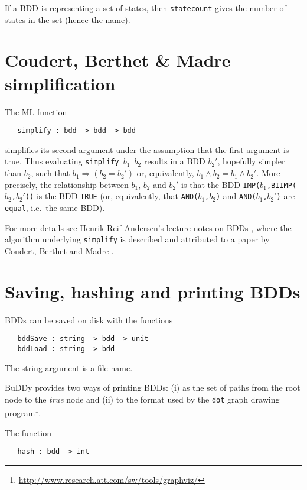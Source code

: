 \documentclass[12pt]{article}
\newcommand{\bnind}[1]{\index[MLbn]{\texttt{#1}}}
\renewcommand{\t}[1]{\mbox{\tt #1}}
\newcommand{\Buddy}{BuDDy\xspace}
\newcommand{\Imp}{\Rightarrow}
\begin{document}
If a BDD is representing a set of states, then \t{statecount} gives
the number of states in the set (hence the name).


\section{Coudert, Berthet \& Madre simplification}

The ML function

\begin{verbatim}
   simplify : bdd -> bdd -> bdd
\end{verbatim}\bnind{simplify}

simplifies its second argument under the assumption that the first
argument is true. Thus evaluating
\t{simplify~$b_1$~$b_2$} results in a BDD $b_2'$, hopefully simpler than $b_2$, such that
$b_1 \Imp (b_2 = b_2')$ or, equivalently, \mbox{$b_1 \wedge b_2 = b_1 \wedge b_2'$}.
More precisely,
the relationship between $b_1$, $b_2$ and $b_2'$ is that
the BDD \t{IMP($b_1$,BIIMP($b_2$,$b_2'$))} is the BDD \t{TRUE}
(or, equivalently, that \t{AND($b_1$,$b_2$)} and \t{AND($b_1$,$b_2'$)}
are \t{equal}, i.e.~the same BDD).

For more details see Henrik Reif Andersen's lecture
notes on BDDs \cite{HenrikNotes}, where
the algorithm underlying \t{simplify} is described and attributed to a paper by
Coudert, Berthet and Madre \cite{CoudertBerthetMadre}.

\section{Saving, hashing and printing BDDs}\label{printing}

BDDs can be saved on disk with the functions

\begin{verbatim}
   bddSave : string -> bdd -> unit
   bddLoad : string -> bdd
\end{verbatim}\bnind{bddSave}\bnind{bddLoad}

The string argument is a file name.

\Buddy{} provides two ways of printing BDDs: (i) as the set of paths from
the root node to the {\it{true}} node and (ii) to the format used by
the \t{dot} graph drawing
program\footnote{\url{http://www.research.att.com/sw/tools/graphviz/}}.

The function

\begin{verbatim}
   hash : bdd -> int
\end{verbatim}\bnind{hash}
\end{document}
